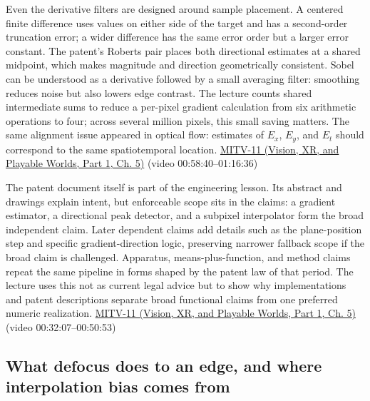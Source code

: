 Even the derivative filters are designed around sample placement. A centered finite difference uses values on either side of the target and has a second-order truncation error; a wider difference has the same error order but a larger error constant. The patent's Roberts pair places both directional estimates at a shared midpoint, which makes magnitude and direction geometrically consistent. Sobel can be understood as a derivative followed by a small averaging filter: smoothing reduces noise but also lowers edge contrast. The lecture counts shared intermediate sums to reduce a per-pixel gradient calculation from six arithmetic operations to four; across several million pixels, this small saving matters. The same alignment issue appeared in optical flow: estimates of \(E_x\), \(E_y\), and \(E_t\) should correspond to the same spatiotemporal location. \href{../07-Vision-XR-and-Playable-Worlds-P01/main.pdf\#nameddest=04-visual-computing-ii-ch036-mitv-11---edge-detection-subpixel-position-cordic-line-detection-us-6408109}{MITV-11 (Vision, XR, and Playable Worlds, Part 1, Ch. 5)} (video 00:58:40--01:16:36)

The patent document itself is part of the engineering lesson. Its abstract and drawings explain intent, but enforceable scope sits in the claims: a gradient estimator, a directional peak detector, and a subpixel interpolator form the broad independent claim. Later dependent claims add details such as the plane-position step and specific gradient-direction logic, preserving narrower fallback scope if the broad claim is challenged. Apparatus, means-plus-function, and method claims repeat the same pipeline in forms shaped by the patent law of that period. The lecture uses this not as current legal advice but to show why implementations and patent descriptions separate broad functional claims from one preferred numeric realization. \href{../07-Vision-XR-and-Playable-Worlds-P01/main.pdf\#nameddest=04-visual-computing-ii-ch036-mitv-11---edge-detection-subpixel-position-cordic-line-detection-us-6408109}{MITV-11 (Vision, XR, and Playable Worlds, Part 1, Ch. 5)} (video 00:32:07--00:50:53)

\subsection{What defocus does to an edge, and where interpolation bias comes from}\label{04-visual-computing-ii-ch030-what-defocus-does-to-an-edge-and-where-interpolation-bias-comes-from}

\hypertarget{04-visual-computing-ii-ch030-what-defocus-does-to-an-edge-and-where-interpolation-bias-comes-from}{}

